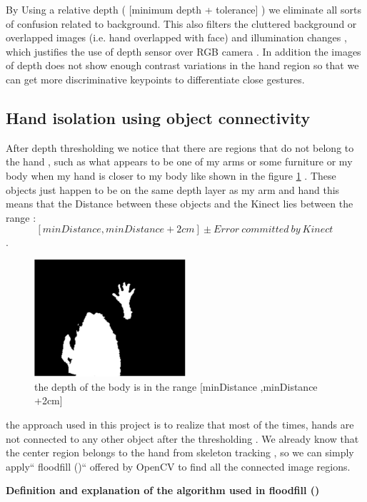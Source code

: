 \newpage

By Using a relative depth ( [minimum depth + tolerance] ) we eliminate all
sorts of confusion related to background. This also filters the cluttered background or overlapped images (i.e. hand overlapped with face) and illumination changes ,  which justifies the use of depth sensor over RGB camera . In addition  the images of depth does not show enough contrast variations  in the hand region  so that we can get more discriminative keypoints to differentiate close gestures. 


\subsection{Hand isolation using object connectivity }

After depth thresholding we notice that there are regions that do not belong to the hand , such as what appears to be one of my  arms or some furniture or my body when my hand is closer to my body like shown in the figure  \ref{fig:cam10} . These objects just happen to be on the same depth layer as my arm and hand this means that the Distance between these objects and the Kinect lies  between the range : $$[minDistance ,minDistance +2cm] \pm {Error\ committed\ by\ Kinect\ } $$  .


\begin{figure}[H]
\centering
\includegraphics[width=0.5\textwidth]{img/depththresholding.png}
\caption{the depth of the body is in  the range [minDistance ,minDistance +2cm]}
\label{fig:cam10}
\end{figure}

the approach used in this project  is to realize that most of the times, hands are not connected to any other object after the thresholding . We already know that the center region belongs to the hand from skeleton tracking , so we can simply apply`` floodfill ()`` offered by OpenCV to find all the connected image regions.

\textbf{ Definition and explanation of the algorithm used in floodfill () }

